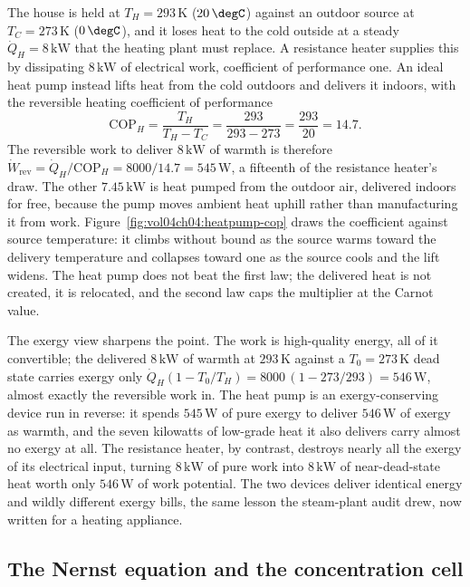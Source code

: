 The house is held at $T_H = 293\,\si{\kelvin}$ ($20\,\degC$) against an outdoor
source at $T_C = 273\,\si{\kelvin}$ ($0\,\degC$), and it loses heat to the cold
outside at a steady $\dot Q_H = 8\,\text{kW}$ that the heating plant must
replace. A resistance heater supplies this by dissipating $8\,\text{kW}$ of
electrical work, coefficient of performance one. An ideal heat pump instead
lifts heat from the cold outdoors and delivers it indoors, with the reversible
heating coefficient of performance
\[
\mathrm{COP}_H = \frac{T_H}{T_H - T_C} = \frac{293}{293 - 273} = \frac{293}{20}
= 14.7.
\]
The reversible work to deliver $8\,\text{kW}$ of warmth is therefore
$\dot W_{\text{rev}} = \dot Q_H/\mathrm{COP}_H = 8000/14.7 = 545\,\text{W}$, a
fifteenth of the resistance heater's draw. The other $7.45\,\text{kW}$ is heat
pumped from the outdoor air, delivered indoors for free, because the pump moves
ambient heat uphill rather than manufacturing it from work.
Figure~\ref{fig:vol04ch04:heatpump-cop} draws the coefficient against source
temperature: it climbs without bound as the source warms toward the delivery
temperature and collapses toward one as the source cools and the lift widens.
The heat pump does not beat the first law; the delivered heat is not created,
it is relocated, and the second law caps the multiplier at the Carnot value.

The exergy view sharpens the point. The work is high-quality energy, all of it
convertible; the delivered $8\,\text{kW}$ of warmth at $293\,\si{\kelvin}$
against a $T_0 = 273\,\si{\kelvin}$ dead state carries exergy only $\dot Q_H(1 -
T_0/T_H) = 8000\,(1 - 273/293) = 546\,\text{W}$, almost exactly the reversible
work in. The heat pump is an exergy-conserving device run in reverse: it spends
$545\,\text{W}$ of pure exergy to deliver $546\,\text{W}$ of exergy as warmth,
and the seven kilowatts of low-grade heat it also delivers carry almost no
exergy at all. The resistance heater, by contrast, destroys nearly all the
exergy of its electrical input, turning $8\,\text{kW}$ of pure work into
$8\,\text{kW}$ of near-dead-state heat worth only $546\,\text{W}$ of work
potential. The two devices deliver identical energy and wildly different exergy
bills, the same lesson the steam-plant audit drew, now written for a heating
appliance.



\subsection{The Nernst equation and the concentration cell}

